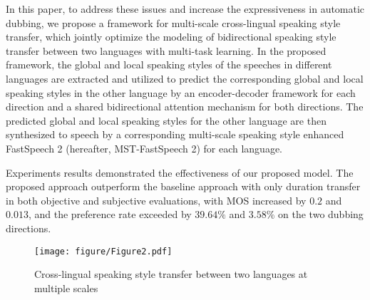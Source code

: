 In this paper,
to address these issues and increase the expressiveness in automatic dubbing,
we propose a framework for multi-scale cross-lingual speaking style transfer, 
which jointly optimize the modeling of bidirectional speaking style transfer between two languages with multi-task learning.
In the proposed framework,
the global and local speaking styles of the speeches in different languages are extracted and utilized to predict the corresponding global and local speaking styles in the other language by an encoder-decoder framework for each direction and a shared bidirectional attention mechanism \cite{li2022neufa} for both directions.
The predicted global and local speaking styles for the other language are then synthesized to speech by
a corresponding multi-scale speaking style enhanced FastSpeech 2 (hereafter, MST-FastSpeech 2) \citep{ren2020fastspeech, li_inferring_2022}
for each language.

Experiments results %
demonstrated the effectiveness of our proposed model.
The proposed approach outperform the baseline approach with only duration transfer in both
objective and subjective evaluations,
with MOS increased by $0.2$ and $0.013$,
and the preference rate exceeded by $39.64\%$ and $3.58\%$
on the two dubbing directions.

\begin{figure}[tb]
	\centering
	\texttt{[image: figure/Figure2.pdf]}
	\caption{Cross-lingual speaking style transfer between two languages at multiple scales}
	\label{fig:emoji}
\end{figure}





